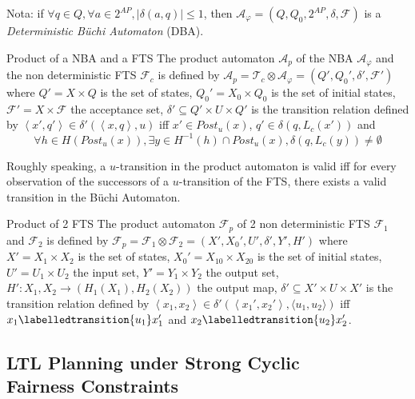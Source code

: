 Nota: if $\forall q \in Q, \forall a \in 2^{AP}, | \delta(a,q) | \leq 1$, then $\mathcal{A}_{\varphi} = (Q, Q_0, 2^{AP}, \delta, \mathcal{F})$ is a \textit{Deterministic B\"uchi Automaton} (DBA).

\begin{nameddef}{Product of a NBA and a FTS}
The product automaton $\mathcal{A}_p$ of the NBA $\mathcal{A}_\varphi$ and the non deterministic FTS $\mathcal{F}_c$ is defined by
$\mathcal{A}_p = \mathcal{T}_c \otimes \mathcal{A}_\varphi
= (Q',Q_0',\delta',\mathcal{F}')$
where
$Q' = X \times Q$ is the set of states,
$Q_0' = X_0 \times Q_0$ is the set of initial states,
$\mathcal{F}' = X \times \mathcal{F}$ the acceptance set,
$\delta' \subseteq Q' \times U \times Q'$
is the transition relation defined by
$\left \langle x',q' \right \rangle \in \delta'(\left \langle x,q \right \rangle ,u)$
iff $x' \in Post_u(x)$, $q' \in \delta(q,L_c(x'))$ and 
$$\forall h \in H(Post_u(x)),\exists y \in H^{-1}(h) \cap Post_u(x), \delta(q,L_c(y)) \neq \emptyset$$
\end{nameddef}

Roughly speaking, a $u$-transition in the product automaton is valid iff for every observation of the successors of a $u$-transition of the FTS, there exists a valid transition in the B\"uchi Automaton.

\begin{nameddef}{Product of 2 FTS}
The product automaton $\mathcal{F}_p$ of 2 non deterministic FTS $\mathcal{F}_1$ and $\mathcal{F}_2$ is defined by
$\mathcal{F}_p = \mathcal{F}_1 \otimes \mathcal{F}_2
= (X',X_0',U',\delta',Y',H')$
where
$X' = X_1 \times X_2$ is the set of states,
$X_0' = X_{10} \times X_{20}$ is the set of initial states,
$U' = U_1 \times U_2$ the input set,
$Y' = Y_1 \times Y_2$ the output set,
$H': X_1,X_2 \rightarrow (H_1(X_1),H_2(X_2))$ the output map,
$\delta' \subseteq X' \times U \times X'$
is the transition relation defined by
$\left \langle x_1,x_2 \right \rangle \in \delta'(\left \langle x_1',x_2' \right \rangle,\langle u_1,u_2 \rangle)$ iff $x_1 \labelledtransition{u_1} x_1'$ and $x_2 \labelledtransition{u_2} x_2'$.
\end{nameddef}


\subsection{LTL Planning under Strong Cyclic \\Fairness Constraints}

\cite{de2010generalized}
\cite{patrizi2013fair}

